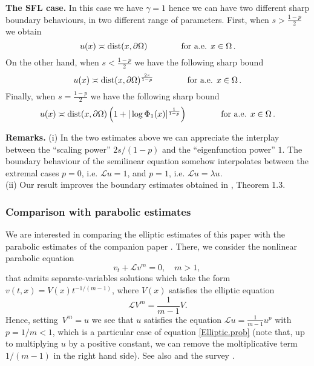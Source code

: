 \documentclass[11pt]{article}
\numberwithin{equation}{section}
\newcommand{\A}{\mathcal{L}}
\def\dist{\mathrm{dist}} %
\begin{document}
\noindent\textbf{The SFL case. }In this case we have $\gamma=1$  hence we can have two different sharp boundary behaviours, in two different range of parameters. First, when $s>  \frac{1-p}{2}$ we obtain
\begin{equation}\label{Thm.Elliptic.Harnack.ineq.m.spectral}
u(x)\asymp \dist(x,\partial\Omega) \qquad\qquad\mbox{for  a.e.  $x\in \Omega$\,.}
\end{equation}
On the other hand, when $s<\frac{1-p}{2}$ we have the following sharp bound
\begin{equation}\label{Lem.Green.2.est.Upper.II.b}
u(x)\asymp\dist(x,\partial\Omega)^{\frac{2s}{1-p}}\qquad\qquad\mbox{for a.e.  $x\in \Omega$\,.}
\end{equation}
Finally, when $s=\frac{1-p}{2}$ we have the following sharp bound
\begin{equation}\label{Lem.Green.2.est.Upper.II.log}
u(x)\asymp\dist(x,\partial\Omega)\left(1+|\log\Phi_1(x) |^{\frac{1}{1-p}}\right)\qquad\qquad\mbox{for a.e.  $x\in \Omega$\,.}
\end{equation}

 \noindent\textbf{Remarks. }(i) In the two estimates above we can appreciate the interplay between the ``scaling power'' $2s/(1-p)$ and the ``eigenfunction power'' $1$. The boundary behaviour of the semilinear equation somehow interpolates between the extremal cases $p=0$, i.e. $\A u= 1$, and $p=1$, i.e. $\A u=\lambda u$.\\
(ii) Our result improves the boundary estimates obtained in \cite{CS2016}, Theorem 1.3.
%
%
\subsubsection{Comparison with parabolic estimates}\label{ssec.m-p-comp}
We are interested in comparing the elliptic estimates of this paper with the parabolic estimates of the companion paper \cite{BFV-Parabolic}. There, we consider the nonlinear parabolic equation\vspace{-2mm}
$$
v_t+\A v^m=0, \quad m>1,\,
$$
that admits  separate-variables solutions which take the form $v(t,x)=V(x)t^{-1/(m-1)}$, where
$V(x)$ satisfies the elliptic equation\vspace{-2mm}
$$
\A V^m = \frac{1}{m-1} V.
$$
Hence, setting\ $V^m=u$ we see that  $u$ satisfies the equation $\A u =\frac{1}{m-1} u^p$ with $p=1/m<1$, which is a particular case of equation \eqref{Elliptic.prob} (note that, up to multiplying $u$ by a positive constant, we can remove the moltiplicative term $1/(m-1)$ in the right hand side). See also \cite{BFR,BSV2013, BV-PPR1} and the survey \cite{Vaz2014}. \vspace{-2mm}
\end{document}
